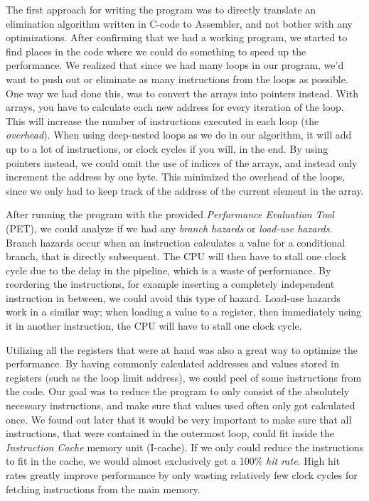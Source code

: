 \documentclass[a4paper,9pt,fleqn]{article}
\begin{document}
The first approach for writing the program was to directly translate an elimination algorithm written
in C-code to Assembler, and not bother with any optimizations. After confirming that we had a working
program, we started to find places in the code where we could do something to speed up the 
performance. We realized that since we had many loops in our program, we'd want to push out or 
eliminate as many instructions from the loops as possible. One way we had done this, was to convert the 
arrays into pointers instead. With arrays, you have to calculate each new address for every iteration of the 
loop. This will increase the number of instructions executed in each loop (the {\it overhead}). When using
deep-nested loops as we do in our algorithm, it will add up to a lot of instructions, or clock cycles if
you will, in the end. By using pointers instead, we could omit the use of indices of the arrays, and instead
only increment the address by one byte. This minimized the overhead of the loops, since we only had to
keep track of the address of the current element in the array.

After running the program with the provided {\it Performance Evaluation Tool} (PET), we could analyze if
we had any {\it branch hazards} or {\it load-use hazards}. Branch hazards occur when an instruction
calculates a value for a conditional branch, that is directly subsequent. The CPU will then have to stall
one clock cycle due to the delay in the pipeline, which is a waste of performance. By reordering the
instructions, for example inserting a completely independent instruction in between, we could avoid
this type of hazard. Load-use hazards work in a similar way; when loading a value to a register,
then immediately using it in another instruction, the CPU will have to stall one clock cycle.

Utilizing all the registers that were at hand was also a great way to optimize the performance. By having
commonly calculated addresses and values stored in registers (such as the loop limit address), we could
peel of some instructions from the code. Our goal was to reduce the program to only consist of the 
absolutely necessary instructions, and make sure that values used often only got calculated once. We 
found out later that it would be very important to make sure that  all instructions, that were contained in the 
outermost loop, could fit inside the {\it Instruction Cache} memory unit (I-cache). If we only could reduce 
the instructions to fit in the cache, we would almost exclusively get a 100\% {\it hit rate}. High hit rates
greatly improve performance by only wasting relatively few clock cycles for fetching instructions from the
main memory.
\end{document}
